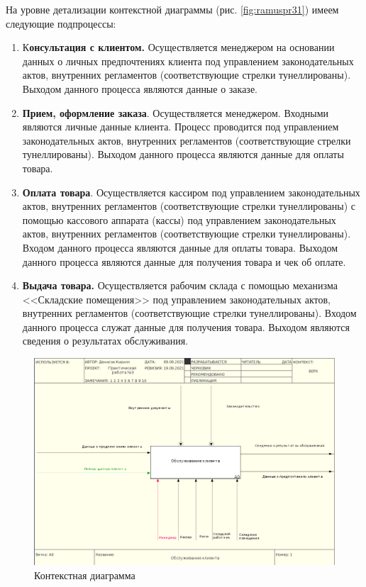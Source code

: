 \documentclass[a4paper,14pt]{extarticle}
\begin{document}
	На уровне детализации контекстной диаграммы (рис. \ref{fig:ramuspr31}) имеем следующие подпроцессы:
	\begin{enumerate}
		\item К\textbf{онсультация с клиентом.} Осуществляется менеджером на основании данных о личных предпочтениях клиента под управлением законодательных актов, внутренних регламентов (соответствующие стрелки тунеллированы). Выходом данного процесса являются данные о заказе.
		
		\item \textbf{Прием, оформление заказа}. Осуществляется менеджером. Входными являются личные данные клиента. Процесс проводится под управлением законодательных актов, внутренних регламентов (соответствующие стрелки тунеллированы). Выходом данного процесса являются данные для оплаты товара.
		
		\item \textbf{Оплата товара}. Осуществляется кассиром под управлением законодательных актов, внутренних регламентов (соответствующие стрелки тунеллированы) с помощью кассового аппарата (кассы) под управлением законодательных актов, внутренних регламентов (соответствующие стрелки тунеллированы). Входом данного процесса являются данные для оплаты товара. Выходом данного процесса являются данные для получения товара и чек об оплате.
		
		\item \textbf{Выдача товара.} Осуществляется рабочим склада с помощью механизма <<Складские помещения>> под управлением законодательных актов, внутренних регламентов (соответствующие стрелки тунеллированы). Входом данного процесса служат данные для получения товара. Выходом являются сведения о результатах обслуживания.
	\end{enumerate}
\begin{figure}[htpb]
	\centering
	\includegraphics[width=0.8\linewidth]{images/ramusPr3}
	\caption{Контекстная диаграмма}
	\label{fig:ramuspr3}
\end{figure}
\end{document}
